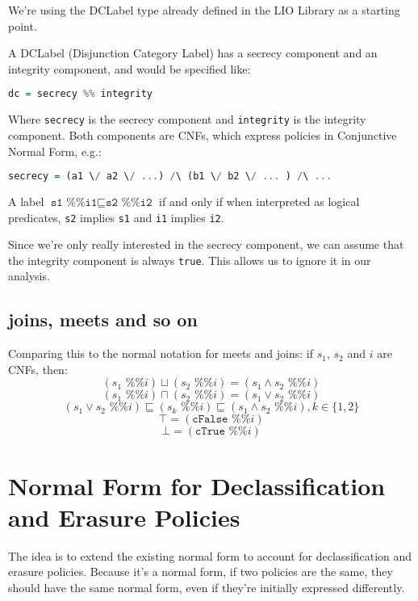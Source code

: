 \documentclass[11pt, oneside]{article}   	%
\begin{document}
We're using the DCLabel type already defined in the LIO Library as a starting point.

A DCLabel (Disjunction Category Label) has a secrecy component and an integrity component, and would be specified like:

\begin{lstlisting}[language=Haskell]
dc = secrecy %% integrity
\end{lstlisting}

Where \texttt{secrecy} is the secrecy component and \texttt{integrity} is the integrity component.
Both components are CNFs, which express policies in Conjunctive Normal Form, e.g.:

\begin{lstlisting}[language=Haskell]
secrecy = (a1 \/ a2 \/ ...) /\ (b1 \/ b2 \/ ... ) /\ ...
\end{lstlisting}

A label $\texttt{s1 \%\% i1} \sqsubseteq \texttt{s2 \%\% i2}$ if and only if when interpreted as logical predicates, \texttt{s2} implies  \texttt{s1} and  \texttt{i1} implies \texttt{i2}.

Since we're only really interested in the secrecy component, we can assume that the integrity component is always \texttt{true}. This allows us to ignore it in our analysis.

\subsection{joins, meets and so on}

Comparing this to the normal notation for meets and joins: if $s_1$, $s_2$ and $i$ are CNFs, then:
$$(s_1\texttt{ \%\% }i) \sqcup (s_2\texttt{ \%\% }i) = (s_1\land s_2 \texttt{ \%\% } i)$$
$$(s_1\texttt{ \%\% }i) \sqcap (s_2\texttt{ \%\% }i) = (s_1\lor s_2 \texttt{ \%\% } i)$$
$$(s_1\lor s_2 \texttt{ \%\% } i) \sqsubseteq (s_k\texttt{ \%\% } i)  \sqsubseteq (s_1\land s_2 \texttt{ \%\% } i), k\in\{1,2\}$$
$$\top = (\texttt{cFalse} \texttt{ \%\% }i)$$
$$\bot = (\texttt{cTrue} \texttt{ \%\% }i)$$

\section{Normal Form for Declassification and Erasure Policies}
The idea is to extend the existing normal form to account for declassification and erasure policies. Because it's a normal form, if two policies are the same, they should have the same normal form, even if they're initially expressed differently.
\end{document}
